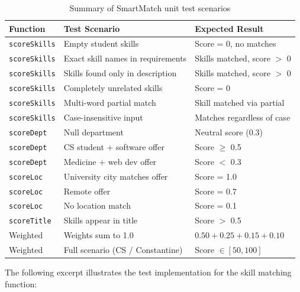 \begin{table}[H]
\centering
\caption{Summary of SmartMatch unit test scenarios}
\label{tab:test-smart}
\footnotesize
\begin{tabular}{|p{3cm}|p{5.5cm}|p{4.5cm}|}
\hline
\textbf{Function} & \textbf{Test Scenario} & \textbf{Expected Result} \\
\hline
\texttt{scoreSkills} & Empty student skills & Score = 0, no matches \\
\hline
\texttt{scoreSkills} & Exact skill names in requirements & Skills matched, score $>$ 0 \\
\hline
\texttt{scoreSkills} & Skills found only in description & Skills matched, score $>$ 0 \\
\hline
\texttt{scoreSkills} & Completely unrelated skills & Score = 0 \\
\hline
\texttt{scoreSkills} & Multi-word partial match & Skill matched via partial \\
\hline
\texttt{scoreSkills} & Case-insensitive input & Matches regardless of case \\
\hline
\texttt{scoreDept} & Null department & Neutral score (0.3) \\
\hline
\texttt{scoreDept} & CS student + software offer & Score $\geq$ 0.5 \\
\hline
\texttt{scoreDept} & Medicine + web dev offer & Score $<$ 0.3 \\
\hline
\texttt{scoreLoc} & University city matches offer & Score = 1.0 \\
\hline
\texttt{scoreLoc} & Remote offer & Score = 0.7 \\
\hline
\texttt{scoreLoc} & No location match & Score = 0.1 \\
\hline
\texttt{scoreTitle} & Skills appear in title & Score $>$ 0.5 \\
\hline
Weighted & Weights sum to 1.0 & $0.50+0.25+0.15+0.10$ \\
\hline
Weighted & Full scenario (CS / Constantine) & Score $\in [50, 100]$ \\
\hline
\end{tabular}
\end{table}

The following excerpt illustrates the test implementation for the skill matching function:

